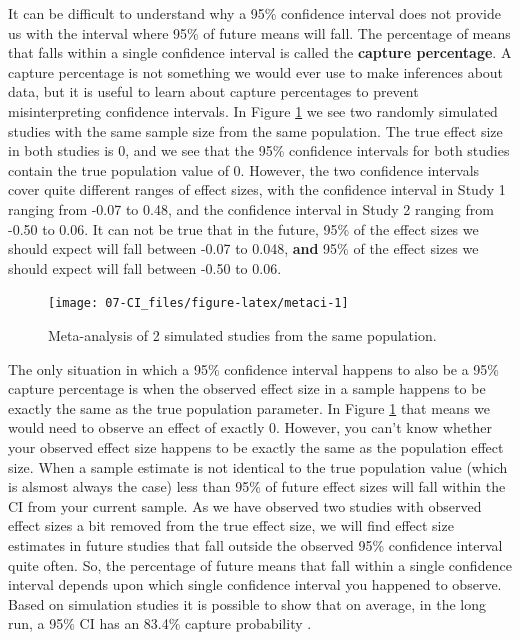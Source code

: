 \documentclass[
  oneside]{book}
\begin{document}
It can be difficult to understand why a 95\% confidence interval does not provide us with the interval where 95\% of future means will fall. The percentage of means that falls within a single confidence interval is called the \textbf{capture percentage}. A capture percentage is not something we would ever use to make inferences about data, but it is useful to learn about capture percentages to prevent misinterpreting confidence intervals. In Figure \ref{fig:metaci} we see two randomly simulated studies with the same sample size from the same population. The true effect size in both studies is 0, and we see that the 95\% confidence intervals for both studies contain the true population value of 0. However, the two confidence intervals cover quite different ranges of effect sizes, with the confidence interval in Study 1 ranging from -0.07 to 0.48, and the confidence interval in Study 2 ranging from -0.50 to 0.06. It can not be true that in the future, 95\% of the effect sizes we should expect will fall between -0.07 to 0.048, \textbf{and} 95\% of the effect sizes we should expect will fall between -0.50 to 0.06.

\begin{figure}

{\centering \texttt{[image: 07-CI\_files/figure-latex/metaci-1]} 

}

\caption{Meta-analysis of 2 simulated studies from the same population.}\label{fig:metaci}
\end{figure}

The only situation in which a 95\% confidence interval happens to also be a 95\% capture percentage is when the observed effect size in a sample happens to be exactly the same as the true population parameter. In Figure \ref{fig:metaci} that means we would need to observe an effect of exactly 0. However, you can't know whether your observed effect size happens to be exactly the same as the population effect size. When a sample estimate is not identical to the true population value (which is alsmost always the case) less than 95\% of future effect sizes will fall within the CI from your current sample. As we have observed two studies with observed effect sizes a bit removed from the true effect size, we will find effect size estimates in future studies that fall outside the observed 95\% confidence interval quite often. So, the percentage of future means that fall within a single confidence interval depends upon which single confidence interval you happened to observe. Based on simulation studies it is possible to show that on average, in the long run, a 95\% CI has an 83.4\% capture probability \citep{cumming_confidence_2006}.
\end{document}
